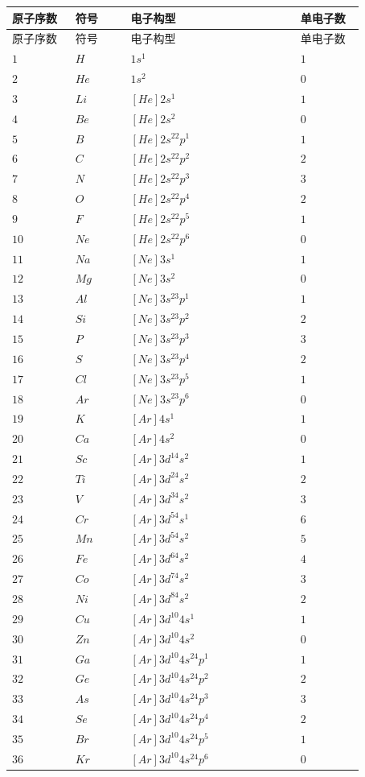 \documentclass[UTF8,zihao=-4,openany]{ctexbook}
\begin{document}
\begin{longtable}{>{\centering\arraybackslash}p{0.16\linewidth} >{\centering\arraybackslash}p{0.14\linewidth} >{\centering\arraybackslash}p{0.43\linewidth} >{\centering\arraybackslash}p{0.16\linewidth}}
\toprule
原子序数 & 符号 & 电子构型 & 单电子数 \\
\midrule
\endfirsthead
\toprule
原子序数 & 符号 & 电子构型 & 单电子数 \\
\midrule
\endhead
$1$ & $H$ & $1s^1$ & $1$ \\
$2$ & $He$ & $1s^2$ & $0$ \\
$3$ & $Li$ & $[He]2s^1$ & $1$ \\
$4$ & $Be$ & $[He]2s^2$ & $0$ \\
$5$ & $B$ & $[He]2s^22p^1$ & $1$ \\
$6$ & $C$ & $[He]2s^22p^2$ & $2$ \\
$7$ & $N$ & $[He]2s^22p^3$ & $3$ \\
$8$ & $O$ & $[He]2s^22p^4$ & $2$ \\
$9$ & $F$ & $[He]2s^22p^5$ & $1$ \\
$10$ & $Ne$ & $[He]2s^22p^6$ & $0$ \\
$11$ & $Na$ & $[Ne]3s^1$ & $1$ \\
$12$ & $Mg$ & $[Ne]3s^2$ & $0$ \\
$13$ & $Al$ & $[Ne]3s^23p^1$ & $1$ \\
$14$ & $Si$ & $[Ne]3s^23p^2$ & $2$ \\
$15$ & $P$ & $[Ne]3s^23p^3$ & $3$ \\
$16$ & $S$ & $[Ne]3s^23p^4$ & $2$ \\
$17$ & $Cl$ & $[Ne]3s^23p^5$ & $1$ \\
$18$ & $Ar$ & $[Ne]3s^23p^6$ & $0$ \\
$19$ & $K$ & $[Ar]4s^1$ & $1$ \\
$20$ & $Ca$ & $[Ar]4s^2$ & $0$ \\
$21$ & $Sc$ & $[Ar]3d^14s^2$ & $1$ \\
$22$ & $Ti$ & $[Ar]3d^24s^2$ & $2$ \\
$23$ & $V$ & $[Ar]3d^34s^2$ & $3$ \\
$24$ & $Cr$ & $[Ar]3d^54s^1$ & $6$ \\
$25$ & $Mn$ & $[Ar]3d^54s^2$ & $5$ \\
$26$ & $Fe$ & $[Ar]3d^64s^2$ & $4$ \\
$27$ & $Co$ & $[Ar]3d^74s^2$ & $3$ \\
$28$ & $Ni$ & $[Ar]3d^84s^2$ & $2$ \\
$29$ & $Cu$ & $[Ar]3d^{10}4s^1$ & $1$ \\
$30$ & $Zn$ & $[Ar]3d^{10}4s^2$ & $0$ \\
$31$ & $Ga$ & $[Ar]3d^{10}4s^24p^1$ & $1$ \\
$32$ & $Ge$ & $[Ar]3d^{10}4s^24p^2$ & $2$ \\
$33$ & $As$ & $[Ar]3d^{10}4s^24p^3$ & $3$ \\
$34$ & $Se$ & $[Ar]3d^{10}4s^24p^4$ & $2$ \\
$35$ & $Br$ & $[Ar]3d^{10}4s^24p^5$ & $1$ \\
$36$ & $Kr$ & $[Ar]3d^{10}4s^24p^6$ & $0$ \\
\bottomrule
\end{longtable}
\endgroup
\end{document}
